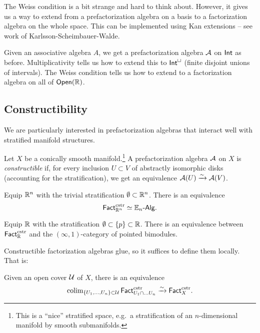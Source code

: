 The Weiss condition is a bit strange and hard to think about.
However, it gives us a way to extend from a prefactorization algebra on a basis to a factorization algebra on the whole space.
This can be implemented using Kan extensions -- see work of Karlsson-Scheimbauer-Walde.

\begin{ex}
	Given an associative algebra $A$, we get a prefactorization algebra $\mathcal{A}$ on $\mathsf{Int}$ as before.
	Multiplicativity tells us how to extend this to $\mathsf{Int}^{\sqcup}$ (finite disjoint unions of intervals).
	The Weiss condition tells us how to extend to a factorization algebra on all of $\mathsf{Open}(\mathbb{R})$.
\end{ex}

\subsection{Constructibility}

We are particularly interested in prefactorization algebras that interact well with stratified manifold structures.

\begin{dfn}
	Let $X$ be a conically smooth manifold.\footnote{This is a ``nice'' stratified space, e.g.\ a stratification of an $n$-dimensional manifold by smooth submanifolds.}
	A prefactorization algebra $\mathcal{A}$ on $X$ is \emph{constructible} if, for every inclusion $U \subset V$ of abstractly isomorphic disks (accounting for the stratification), we get an equivalence $\mathcal{A}(U) \xrightarrow{\sim} \mathcal{A}(V)$.
\end{dfn}

\begin{thm}[Lurie]
	Equip $\mathbb{R}^n$ with the trivial stratification $\emptyset \subset \mathbb{R}^n$.
	There is an equivalence
	\[
		\mathsf{Fact}_{\mathbb{R}^n}^{\mathrm{cstr}} \simeq \mathbb{E}_n\textrm{-}\mathsf{Alg}.
	\]
\end{thm}

\begin{thm}
	Equip $\mathbb{R}$ with the stratification $\emptyset \subset \{ p \} \subset \mathbb{R}$.
	There is an equivalence between $\mathsf{Fact}_{\mathbb{R}}^{\mathrm{cstr}}$ and the $(\infty, 1)$-category of pointed bimodules. 
\end{thm}

Constructible factorization algebras glue, so it suffices to define them locally.
That is:

\begin{thm}
	Given an open cover $\mathcal{U}$ of $X$, there is an equivalence
	\[
		\operatorname{colim}_{\{U_1, \dots, U_n\} \subset \mathcal{U}} \mathsf{Fact}_{U_1 \cap \dots U_n}^{\mathrm{cstr}} \xrightarrow{\sim} \mathsf{Fact}_X^{\mathrm{cstr}}.
	\]
\end{thm}

